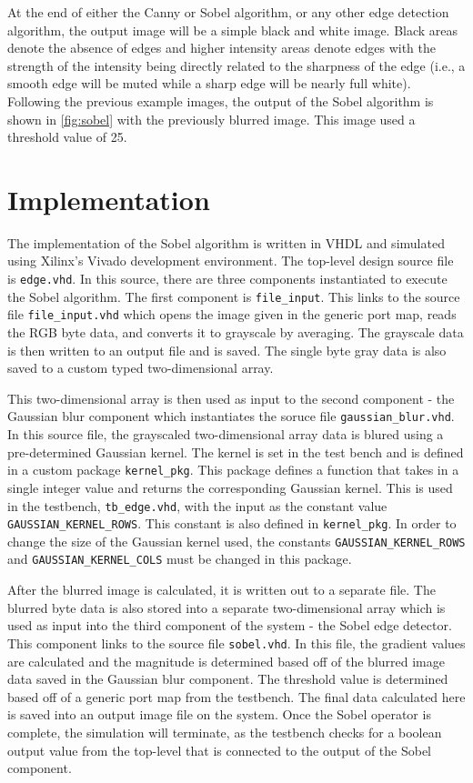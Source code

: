 \documentclass[12pt]{article}
\begin{document}
			At the end of either the Canny or Sobel algorithm, or any other edge detection algorithm, the output image will be a simple black and white image. Black areas denote the absence of edges and higher intensity areas denote edges with the strength of the intensity being directly related to the sharpness of the edge (i.e., a smooth edge will be muted while a sharp edge will be nearly full white). Following the previous example images, the output of the Sobel algorithm is shown in \autoref{fig:sobel} with the previously blurred image. This image used a threshold value of 25.

	\section{Implementation}
		\label{sec:implementation}
		The implementation of the Sobel algorithm is written in VHDL and simulated using Xilinx's Vivado development environment. The top-level design source file is \texttt{edge.vhd}. In this source, there are three components instantiated to execute the Sobel algorithm. The first component is \texttt{file\_input}. This links to the source file \texttt{file\_input.vhd} which opens the image given in the generic port map, reads the RGB byte data, and converts it to grayscale by averaging. The grayscale data is then written to an output file and is saved. The single byte gray data is also saved to a custom typed two-dimensional array.

		This two-dimensional array is then used as input to the second component - the Gaussian blur component which instantiates the soruce file \texttt{gaussian\_blur.vhd}. In this source file, the grayscaled two-dimensional array data is blured using a pre-determined Gaussian kernel. The kernel is set in the test bench and is defined in a custom package \texttt{kernel\_pkg}. This package defines a function that takes in a single integer value and returns the corresponding Gaussian kernel. This is used in the testbench, \texttt{tb\_edge.vhd}, with the input as the constant value \texttt{GAUSSIAN\_KERNEL\_ROWS}. This constant is also defined in \texttt{kernel\_pkg}. In order to change the size of the Gaussian kernel used, the constants \texttt{GAUSSIAN\_KERNEL\_ROWS} and \texttt{GAUSSIAN\_KERNEL\_COLS} must be changed in this package.

		After the blurred image is calculated, it is written out to a separate file. The blurred byte data is also stored into a separate two-dimensional array which is used as input into the third component of the system - the Sobel edge detector. This component links to the source file \texttt{sobel.vhd}. In this file, the gradient values are calculated and the magnitude is determined based off of the blurred image data saved in the Gaussian blur component. The threshold value is determined based off of a generic port map from the testbench. The final data calculated here is saved into an output image file on the system. Once the Sobel operator is complete, the simulation will terminate, as the testbench checks for a boolean output value from the top-level that is connected to the output of the Sobel component. 
\end{document}
